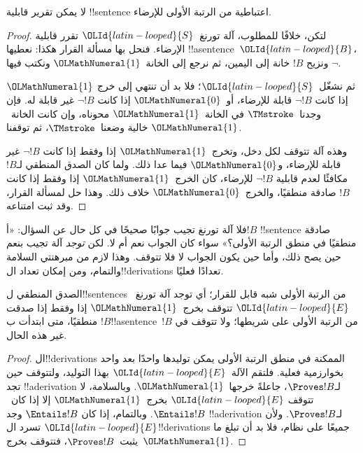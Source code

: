 \documentclass[../../../include/open-logic-section]{subfiles}
\begin{document}
\begin{cor}%
لا يمكن تقرير قابلية !!{sentence} اعتباطية من الرتبة الأولى
للإرضاء.
\end{cor}

\begin{proof}
  لتكن، خلافًا للمطلوب، آلة تورنغ~${\OLId{latin-looped}{S}}$ تقرر قابلية الإرضاء.
  فنحل بها مسألة القرار هكذا: نعطيها !!a{sentence}~${\OLId{latin-looped}{B}}$،
  ونزيح $!B$ خانة إلى اليمين، ثم نرجع إلى الخانة~${\OLMathNumeral{1}}$
  ونكتب فيها $\lnot$.

  ثم نشغّل~${\OLId{latin-looped}{S}}$؛ فلا بد أن تنتهي إلى خرج ${\OLMathNumeral{1}}$ إذا كانت
  $\lnot !B$ قابلة للإرضاء، أو~${\OLMathNumeral{0}}$ إذا كانت $\lnot !B$
  غير قابلة له. فإن وجدنا~$\TMstroke$ في الخانة~${\OLMathNumeral{1}}$
  محوناه، وإن كانت الخانة~${\OLMathNumeral{1}}$ خالية وضعنا~$\TMstroke$،
  ثم توقفنا.

  وهذه آلة تتوقف لكل دخل، وتخرج~${\OLMathNumeral{1}}$ إذا وفقط إذا كانت
  $\lnot !B$ غير قابلة للإرضاء، و${\OLMathNumeral{0}}$ فيما عدا ذلك.
  ولما كان الصدق المنطقي لـ$!B$ مكافئًا لعدم قابلية
  $\lnot !B$ للإرضاء، كان الخرج~${\OLMathNumeral{1}}$ إذا وفقط إذا كانت
  $!B$ صادقة منطقيًا، والخرج~${\OLMathNumeral{0}}$ خلاف ذلك. وهذا حل لمسألة
  القرار، وقد ثبت امتناعه.
\end{proof}

\begin{explain}
فلا آلة تورنغ تجيب جوابًا صحيحًا في كل حال عن السؤال:
«أ$!B$ !!{sentence} صادقة منطقيًا في منطق الرتبة الأولى؟»
سواء كان الجواب نعم أم لا. لكن \emph{توجد} آلة تجيب بنعم حين
يصح ذلك، وأما حين يكون الجواب لا فلا تتوقف. وهذا لازم من
مبرهنتي السلامة والتمام، ومن إمكان تعداد ال!!{derivation}s
تعدادًا فعليًا.
\end{explain}

\begin{thm}
  الصدق المنطقي ل!!{sentence}s من الرتبة الأولى شبه قابل
  للقرار؛ أي توجد آلة تورنغ~${\OLId{latin-looped}{E}}$ تتوقف بخرج~${\OLMathNumeral{1}}$ إذا وفقط إذا
  صدقت $!B$ منطقيًا، متى ابتدأت ب!!a{sentence}~$!B$
  من الرتبة الأولى على شريطها؛ ولا تتوقف في غير هذه الحال.
\end{thm}

\begin{proof}
  ال!!{derivation}s الممكنة في منطق الرتبة الأولى يمكن توليدها
  واحدًا بعد واحد بخوارزمية فعلية. فلتقم الآلة~${\OLId{latin-looped}{E}}$ بهذا
  التوليد، ولتتوقف حين تجد !!a{derivation} لـ$\Proves !B$،
  جاعلةً خرجها~${\OLMathNumeral{1}}$. وبالسلامة، لا تتوقف ${\OLId{latin-looped}{E}}$ بخرج~${\OLMathNumeral{1}}$
  إلا إذا كان~$\Entails !B$. وبالتمام، إذا كان
  $\Entails !B$ وجد !!a{derivation} لـ$\Proves !B$.
  ولأن ${\OLId{latin-looped}{E}}$ تسرد ال!!{derivation}s جميعًا على نظام،
  فلا بد أن تبلغ ما يثبت~$\Proves !B$، فتتوقف بخرج~${\OLMathNumeral{1}}$.
\end{proof}
\end{document}
